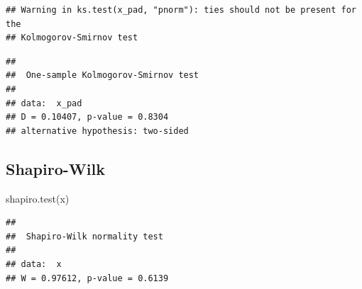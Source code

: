 \documentclass[
]{article}
\newenvironment{Shaded}{\begin{snugshade}}{\end{snugshade}}
\newcommand{\FunctionTok}[1]{\textcolor[rgb]{0.00,0.00,0.00}{#1}}
\newcommand{\NormalTok}[1]{#1}
\begin{document}
\begin{verbatim}
## Warning in ks.test(x_pad, "pnorm"): ties should not be present for the
## Kolmogorov-Smirnov test
\end{verbatim}

\begin{verbatim}
## 
##  One-sample Kolmogorov-Smirnov test
## 
## data:  x_pad
## D = 0.10407, p-value = 0.8304
## alternative hypothesis: two-sided
\end{verbatim}

\hypertarget{shapiro-wilk}{%
\subsection{Shapiro-Wilk}\label{shapiro-wilk}}

\begin{Shaded}
\begin{Highlighting}[]
\FunctionTok{shapiro.test}\NormalTok{(x)}
\end{Highlighting}
\end{Shaded}

\begin{verbatim}
## 
##  Shapiro-Wilk normality test
## 
## data:  x
## W = 0.97612, p-value = 0.6139
\end{verbatim}
\end{document}
